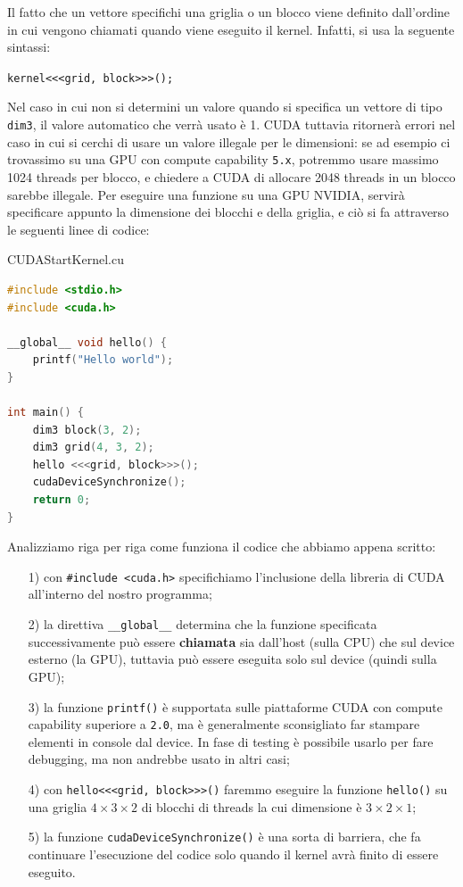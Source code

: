 Il fatto che un vettore specifichi una griglia o un blocco viene definito dall'ordine in cui vengono chiamati quando viene eseguito il kernel. Infatti, si usa la seguente sintassi:

\begin{center}
    \verb|kernel<<<grid, block>>>();|
\end{center}

Nel caso in cui non si determini un valore quando si specifica un vettore di tipo \verb|dim3|, il valore automatico che verrà usato è 1. CUDA tuttavia ritornerà errori nel caso in cui si cerchi di usare un valore illegale per le dimensioni: se ad esempio ci trovassimo su una GPU con compute capability \verb|5.x|, potremmo usare massimo 1024 threads per blocco, e chiedere a CUDA di allocare 2048 threads in un blocco sarebbe illegale.
\nwl
Per eseguire una funzione su una GPU NVIDIA, servirà specificare appunto la dimensione dei blocchi e della griglia, e ciò si fa attraverso le seguenti linee di codice:

\begin{codeblock}{CUDAStartKernel.cu}
    \begin{lstlisting}[language = C]
#include <stdio.h>
#include <cuda.h>

__global__ void hello() {
    printf("Hello world");
}

int main() {
    dim3 block(3, 2);
    dim3 grid(4, 3, 2);
    hello <<<grid, block>>>();
    cudaDeviceSynchronize();
    return 0;
}\end{lstlisting}
\end{codeblock}

Analizziamo riga per riga come funziona il codice che abbiamo appena scritto:
\begin{itemize}
    \item [1)] con \verb|#include <cuda.h>| specifichiamo l'inclusione della libreria di CUDA all'interno del nostro programma;
    \item [2)] la direttiva \verb|__global__| determina che la funzione specificata successivamente può essere \textbf{chiamata} sia dall'host (sulla CPU) che sul device esterno (la GPU), tuttavia può essere eseguita solo sul device (quindi sulla GPU);
    \item [3)] la funzione \verb|printf()| è supportata sulle piattaforme CUDA con compute capability superiore a \verb|2.0|, ma è generalmente sconsigliato far stampare elementi in console dal device. In fase di testing è possibile usarlo per fare debugging, ma non andrebbe usato in altri casi;
    \item [4)] con \verb|hello<<<grid, block>>>()| faremmo eseguire la funzione \verb|hello()| su una griglia $4 \times 3 \times 2$ di blocchi di threads la cui dimensione è $3 \times 2 \times 1$;
    \item [5)] la funzione \verb|cudaDeviceSynchronize()| è una sorta di barriera, che fa continuare l'esecuzione del codice solo quando il kernel avrà finito di essere eseguito.
\end{itemize}

